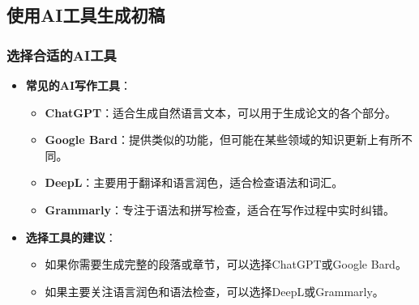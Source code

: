 \subsection{使用AI工具生成初稿}
\subsubsection{选择合适的AI工具}
\begin{itemize}
    \item \textbf{常见的AI写作工具}：
    \begin{itemize}
        \item \textbf{ChatGPT}：适合生成自然语言文本，可以用于生成论文的各个部分。
        \item \textbf{Google Bard}：提供类似的功能，但可能在某些领域的知识更新上有所不同。
        \item \textbf{DeepL}：主要用于翻译和语言润色，适合检查语法和词汇。
        \item \textbf{Grammarly}：专注于语法和拼写检查，适合在写作过程中实时纠错。
    \end{itemize}
    \item \textbf{选择工具的建议}：
    \begin{itemize}
        \item 如果你需要生成完整的段落或章节，可以选择ChatGPT或Google Bard。
        \item 如果主要关注语言润色和语法检查，可以选择DeepL或Grammarly。
    \end{itemize}
\end{itemize}

